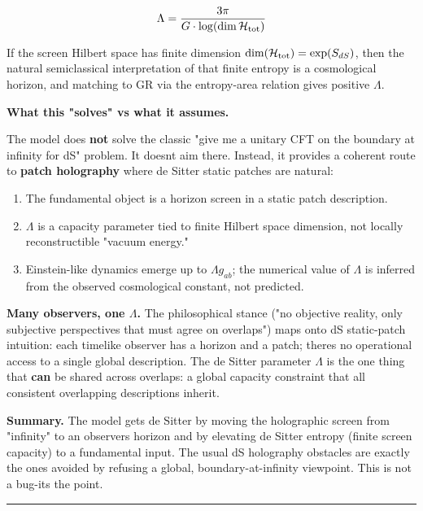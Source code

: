 \[
\Lambda = \frac{3\pi}{G \cdot \log(\dim \mathcal{H}_{\rm tot})}
\]

If the screen Hilbert space has finite dimension \(\dim(\mathcal{H}_{\rm tot})
= \exp(S_{dS})\), then the natural semiclassical interpretation of that finite entropy is a cosmological horizon, and matching to GR via the entropy-area relation gives positive \(\Lambda\).

\textbf{What this "solves" vs what it assumes.}

The model does \textbf{not} solve the classic "give me a unitary CFT on the boundary at infinity for dS" problem. It doesn\textquotesingle t aim there. Instead, it provides a coherent route to \textbf{patch holography} where de Sitter static patches are natural:

\begin{enumerate}
\def\labelenumi{\arabic{enumi}.}
\tightlist
\item
  The fundamental object is a horizon screen in a static patch description.
\item
  \(\Lambda\) is a capacity parameter tied to finite Hilbert space dimension, not locally reconstructible "vacuum energy."
\item
  Einstein-like dynamics emerge up to \(\Lambda g_{ab}\); the numerical value of \(\Lambda\) is inferred from the observed cosmological constant, not predicted.
\end{enumerate}

\textbf{Many observers, one \(\Lambda\).} The philosophical stance ("no objective reality, only subjective perspectives that must agree on overlaps") maps onto dS static-patch intuition: each timelike observer has a horizon and a patch; there\textquotesingle s no operational access to a single global description. The de Sitter parameter \(\Lambda\) is the one thing that \textbf{can} be shared across overlaps: a global capacity constraint that all consistent overlapping descriptions inherit.

\textbf{Summary.} The model gets de Sitter by moving the holographic screen from "infinity" to an observer\textquotesingle s horizon and by elevating de Sitter entropy (finite screen capacity) to a fundamental input. The usual dS holography obstacles are exactly the ones avoided by refusing a global, boundary-at-infinity viewpoint. This is not a bug-it\textquotesingle s the point.

\begin{center}\rule{0.5\linewidth}{0.5pt}\end{center}

